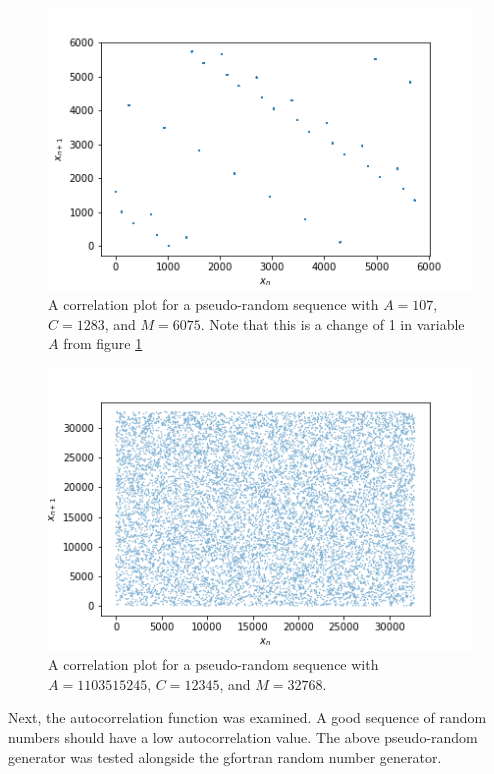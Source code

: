 \documentclass[twocolumn]{article}
\begin{document}
\begin{figure}
	\centering
	\includegraphics[width=\linewidth]{fig2}
	\caption{A correlation plot for a pseudo-random sequence with $A=107$, $C=1283$, and $M=6075$. Note that this is a change of 1 in variable $A$ from figure \ref{fig:fig2}}
	\label{fig:fig2}
\end{figure}

\begin{figure}
	\centering
	\includegraphics[width=\linewidth]{fig3}
	\caption{A correlation plot for a pseudo-random sequence with $A=1103515245$, $C=12345$, and $M=32768$.}
	\label{fig:fig3}
\end{figure}

Next, the autocorrelation function was examined. A good sequence of random numbers should have a low autocorrelation value. The above pseudo-random generator was tested alongside the gfortran random number generator.
\end{document}
